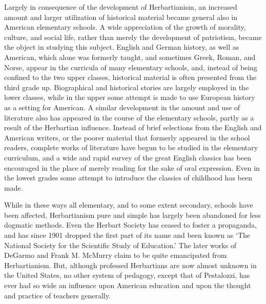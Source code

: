 \documentclass[]{book}
\begin{document}
Largely in consequence of the development of Herbartianism, an increased amount and larger utilization of historical material became general also in American elementary schools. A wide appreciation of the growth of morality, culture, and social life, rather than merely the development of patriotism, became the object in studying this subject. English and German history, as well as American, which alone was formerly taught, and sometimes Greek, Roman, and Norse, appear in the curricula of many elementary schools, and, instead of being confined to the two upper classes, historical material is often presented from the third grade up. Biographical and historical stories are largely employed in the lower classes, while in the upper some attempt is made to use European history as a setting for American. A similar development in the amount and use of literature also has appeared in the course of the elementary schools, partly as a result of the Herbartian influence. Instead of brief selections from the English and American writers, or the poorer material that formerly appeared in the school readers, complete works of literature have begun to be studied in the elementary curriculum, and a wide and rapid survey of the great English classics has been encouraged in the place of merely reading for the sake of oral expression. Even in the lowest grades some attempt to introduce the classics of childhood has been made.

While in these ways all elementary, and to some extent secondary, schools have been affected, Herbartianism pure and simple has largely been abandoned for less dogmatic methods. Even the Herbart Society has ceased to foster a propaganda, and has since 1901 dropped the first part of its name and been known as `The National Society for the Scientific Study of Education.' The later works of DeGarmo and Frank M. McMurry claim to be quite emancipated from Herbartianism. But, although professed Herbartians are now almost unknown in the United States, no other system of pedagogy, except that of Pestalozzi, has ever had so wide an influence upon American education and upon the thought and practice of teachers generally.
\end{document}
